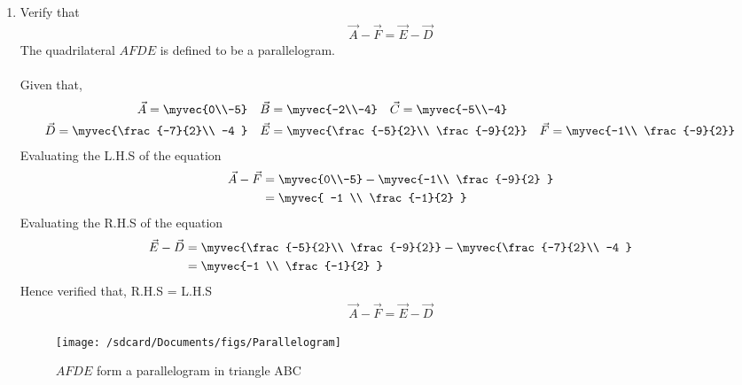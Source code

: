 \documentclass[11pt]{book}
\begin{document}
\begin{enumerate}[label=\thesection.\arabic*.,ref=\thesection.\theenumi]
\item Verify that 
		\begin{align}
\vec{A}-\vec{F}=\vec{E}-\vec{D}
		\end{align}
The quadrilateral $AFDE$ is defined to be a parallelogram.\\
\solution \\
Given that,
\begin{align}
    \vec{A} = \myvec{0\\-5}
    \quad
    \vec{B} &= \myvec{-2\\-4}
    \quad
    \vec{C} = \myvec{-5\\-4}\\
    \vec{D} = \myvec{\frac{-7}{2}\\ -4 }
    \quad
    \vec{E} &= \myvec{\frac{-5}{2}\\ \frac{-9}{2}}
    \quad
    \vec{F} = \myvec{-1\\ \frac{-9}{2}}
\end{align}
Evaluating the L.H.S of the equation
\begin{align}
    \vec{A}-\vec{F}&=\myvec{0\\-5}-\myvec{-1\\ \frac{-9}{2} }\\
    &=\myvec{ -1 \\ \frac{-1}{2} }
\end{align} 
Evaluating the R.H.S of the equation
\begin{align}
    \vec{E}-\vec{D}&=\myvec{\frac{-5}{2}\\ \frac{-9}{2}}-\myvec{\frac{-7}{2}\\ -4 }\\
    &=\myvec{-1 \\ \frac{-1}{2} }
\end{align}
Hence verified that, R.H.S = L.H.S
\begin{align}
	\vec{A}-\vec{F} = \vec{E}-\vec{D}
\end{align}
\begin{figure}[H]
	\texttt{[image: /sdcard/Documents/figs/Parallelogram]}
	\caption{$AFDE$ form a parallelogram in triangle ABC}
	\label{fig:Parallelogram}
\end{figure}

\latexprintindex
\end{enumerate}
\end{document}
